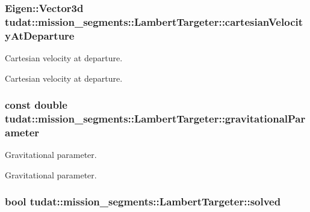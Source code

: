 \subsubsection[{\texorpdfstring{cartesian\+Velocity\+At\+Departure}{cartesianVelocityAtDeparture}}]{\setlength{\rightskip}{0pt plus 5cm}Eigen\+::\+Vector3d tudat\+::mission\+\_\+segments\+::\+Lambert\+Targeter\+::cartesian\+Velocity\+At\+Departure\hspace{0.3cm}{\ttfamily [protected]}}\hypertarget{classtudat_1_1mission__segments_1_1LambertTargeter_a461475bd753a2ba590f1a403a8695794}{}\label{classtudat_1_1mission__segments_1_1LambertTargeter_a461475bd753a2ba590f1a403a8695794}


Cartesian velocity at departure. 

Cartesian velocity at departure. 
\subsubsection[{\texorpdfstring{gravitational\+Parameter}{gravitationalParameter}}]{\setlength{\rightskip}{0pt plus 5cm}const double tudat\+::mission\+\_\+segments\+::\+Lambert\+Targeter\+::gravitational\+Parameter\hspace{0.3cm}{\ttfamily [protected]}}\hypertarget{classtudat_1_1mission__segments_1_1LambertTargeter_ab22c920bfc0f13cdfee122fa2bb93ea2}{}\label{classtudat_1_1mission__segments_1_1LambertTargeter_ab22c920bfc0f13cdfee122fa2bb93ea2}


Gravitational parameter. 

Gravitational parameter. 
\subsubsection[{\texorpdfstring{solved}{solved}}]{\setlength{\rightskip}{0pt plus 5cm}bool tudat\+::mission\+\_\+segments\+::\+Lambert\+Targeter\+::solved\hspace{0.3cm}{\ttfamily [protected]}}\hypertarget{classtudat_1_1mission__segments_1_1LambertTargeter_aa9dd030ab3e408d72f44c4f9ea2fe03a}{}\label{classtudat_1_1mission__segments_1_1LambertTargeter_aa9dd030ab3e408d72f44c4f9ea2fe03a}


